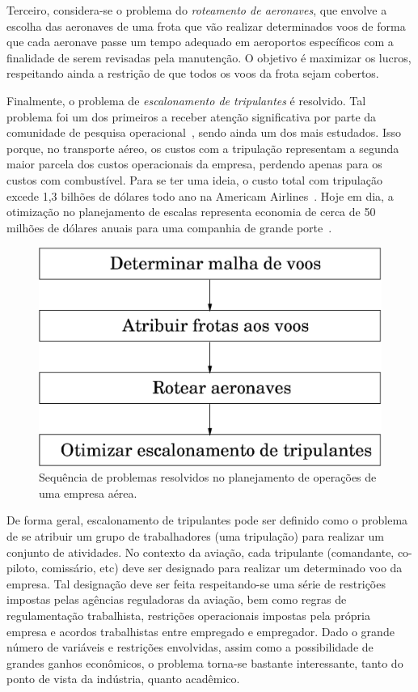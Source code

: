 \documentclass[12pt,a4paper]{article}
\begin{document}
Terceiro, considera-se o problema do \emph{roteamento de aeronaves}, que envolve a escolha das
aeronaves de uma frota que vão realizar determinados voos de forma que cada aeronave passe um tempo
adequado em aeroportos específicos com a finalidade de serem revisadas pela manutenção. O objetivo é
maximizar os lucros, respeitando ainda a restrição de que todos os voos da frota sejam cobertos.

Finalmente, o problema de \emph{escalonamento de tripulantes} é resolvido. Tal problema foi um dos
primeiros a receber atenção significativa por parte da comunidade de pesquisa
operacional~\cite{arabeyre69}, sendo ainda um dos mais estudados. Isso porque, no transporte aéreo,
os custos com a tripulação representam a segunda maior parcela dos custos operacionais da empresa,
perdendo apenas para os custos com combustível. Para se ter uma ideia, o custo total com tripulação
excede 1,3 bilhões de dólares todo ano na Americam Airlines~\cite{anbil91a}. Hoje em dia, a
otimização no planejamento de escalas representa economia de cerca de 50 milhões de dólares anuais
para uma companhia de grande porte~\cite{barnhart03}.

\begin{figure}[htbp]
	\begin{center}
		\includegraphics[scale=0.5]{fig/planejamento.eps}
		\caption{Sequência de problemas resolvidos no planejamento de operações de uma empresa aérea.}
		\label{fig:planejamento}
	\end{center}
\end{figure}

De forma geral, escalonamento de tripulantes pode ser definido como o problema de se atribuir um
grupo de trabalhadores (uma tripulação) para realizar um conjunto de atividades. No contexto da
aviação, cada tripulante (comandante, co-piloto, comissário, etc) deve ser designado para realizar
um determinado voo da empresa. Tal designação deve ser feita respeitando-se uma série de restrições
impostas pelas agências reguladoras da aviação, bem como regras de regulamentação trabalhista,
restrições operacionais impostas pela própria empresa e acordos trabalhistas entre empregado e
empregador. Dado o grande número de variáveis e restrições envolvidas, assim como a possibilidade de
grandes ganhos econômicos, o problema torna-se bastante interessante, tanto do ponto de vista da
indústria, quanto acadêmico.
\end{document}
